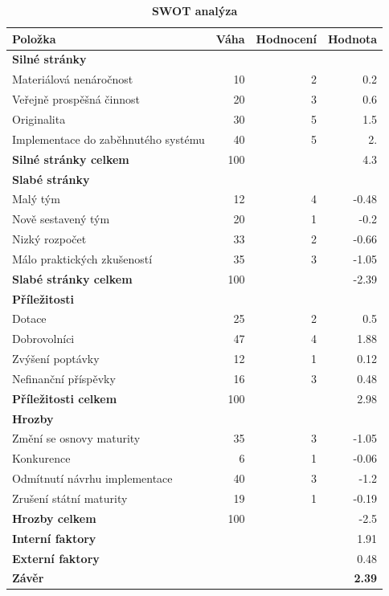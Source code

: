 \documentclass[12pt, a4paper]{report}
\begin{document}
\begin{table}[htbp]
\caption{\label{tab:swot}
\textbf{SWOT analýza}}
\centering
\footnotesize
\begin{tabularx}{\textwidth}{|X|r|r|r|}
\hline
Položka & Váha & Hodnocení & Hodnota\\
\hline
\textbf{Silné stránky} &  &  & \\
Materiálová nenáročnost & 10 & 2 & 0.2\\
Veřejně prospěšná činnost & 20 & 3 & 0.6\\
Originalita & 30 & 5 & 1.5\\
Implementace do zaběhnutého systému & 40 & 5 & 2.\\
\hline
\textbf{Silné stránky celkem} & 100 &  & 4.3\\
\hline
\textbf{Slabé stránky} &  &  & \\
Malý tým & 12 & 4 & -0.48\\
Nově sestavený tým & 20 & 1 & -0.2\\
Nizký rozpočet & 33 & 2 & -0.66\\
Málo praktických zkušeností & 35 & 3 & -1.05\\
\hline
\textbf{Slabé stránky celkem} & 100 &  & -2.39\\
\hline
\textbf{Příležitosti} &  &  & \\
Dotace & 25 & 2 & 0.5\\
Dobrovolníci & 47 & 4 & 1.88\\
Zvýšení poptávky & 12 & 1 & 0.12\\
Nefinanční příspěvky & 16 & 3 & 0.48\\
\hline
\textbf{Příležitosti celkem} & 100 &  & 2.98\\
\hline
\textbf{Hrozby} &  &  & \\
Změní se osnovy maturity & 35 & 3 & -1.05\\
Konkurence & 6 & 1 & -0.06\\
Odmítnutí návrhu implementace & 40 & 3 & -1.2\\
Zrušení státní maturity & 19 & 1 & -0.19\\
\hline
\textbf{Hrozby celkem} & 100 &  & -2.5\\
\hline
\textbf{Interní faktory} &  &  & 1.91\\
\textbf{Externí faktory} &  &  & 0.48\\
\hline
\textbf{Závěr} &  &  & \textbf{2.39}\\
\hline
\end{tabularx}
\end{table}
\end{document}
